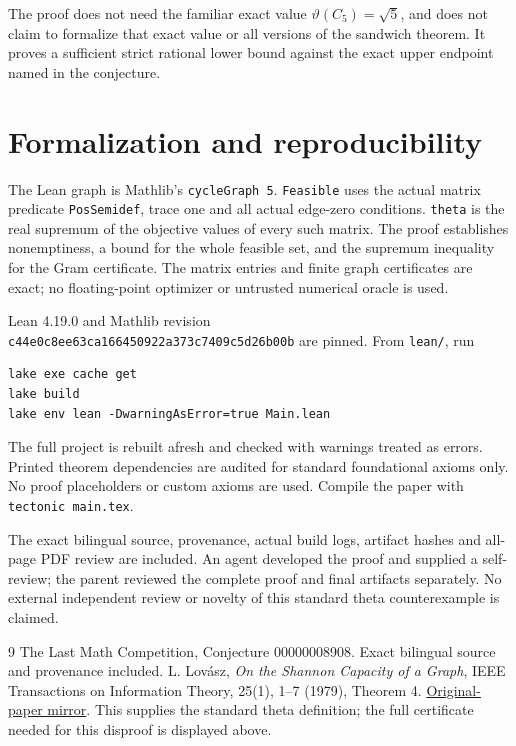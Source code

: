 \documentclass[11pt]{article}
\begin{document}
The proof does not need the familiar exact value
$\vartheta(C_5)=\sqrt5$, and does not claim to formalize
that exact value or all versions of the sandwich theorem.
It proves a sufficient strict rational lower bound against
the exact upper endpoint named in the conjecture.

\section*{Formalization and reproducibility}
The Lean graph is Mathlib's \texttt{cycleGraph 5}.
\texttt{Feasible} uses the actual matrix predicate
\texttt{PosSemidef}, trace one and all actual edge-zero
conditions. \texttt{theta} is the real supremum of the
objective values of every such matrix. The proof establishes
nonemptiness, a bound for the whole feasible set, and the
supremum inequality for the Gram certificate.
The matrix entries and finite graph certificates are exact;
no floating-point optimizer or untrusted numerical oracle
is used.

Lean 4.19.0 and Mathlib revision\\
\texttt{c44e0c8ee63ca166450922a373c7409c5d26b00b}
are pinned. From \texttt{lean/}, run
\begin{verbatim}
lake exe cache get
lake build
lake env lean -DwarningAsError=true Main.lean
\end{verbatim}
The full project is rebuilt afresh and checked with
warnings treated as errors. Printed theorem dependencies
are audited for standard foundational axioms only.
No proof placeholders or custom axioms are used.
Compile the paper with \texttt{tectonic main.tex}.

The exact bilingual source, provenance, actual build logs,
artifact hashes and all-page PDF review are included.
An agent developed the proof and supplied a self-review;
the parent reviewed the complete proof and final artifacts
separately. No external independent review or novelty of
this standard theta counterexample is claimed.

\begin{thebibliography}{9}
 The Last Math Competition,
Conjecture 00000008908. Exact bilingual source and
provenance included.
 L. Lov\'asz, \emph{On the Shannon Capacity
of a Graph}, IEEE Transactions on Information Theory,
25(1), 1--7 (1979), Theorem 4.
\href{https://people.orie.cornell.edu/miketodd/orie6327/lovshannon.pdf}{Original-paper mirror}.
This supplies the standard theta definition; the full
certificate needed for this disproof is displayed above.
\end{thebibliography}
\end{document}
